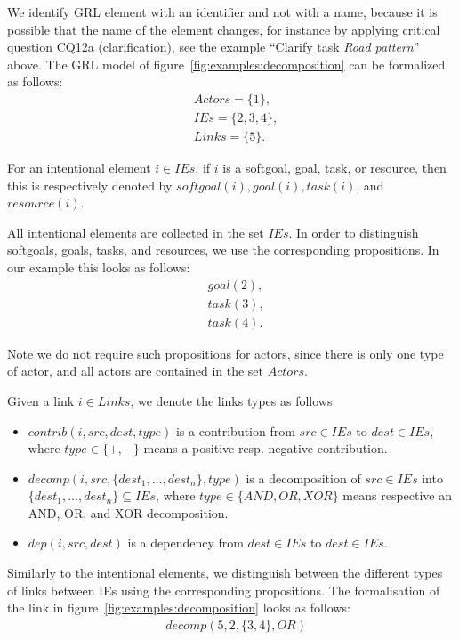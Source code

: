 \rationale{} We identify GRL element with an identifier and not with a name, because it is possible that the name of the element changes, for instance by applying critical question CQ12a (clarification), see the example ``Clarify task \emph{Road pattern}'' above. The GRL model of figure~\ref{fig:examples:decomposition} can be formalized as follows: 
\begin{align*}
&Actors = \{1\},\\
&IEs = \{2, 3, 4\},\\ 
&Links = \{5\}.
\end{align*}

\begin{definition}
For an intentional element $i\in IEs$, if $i$ is a softgoal, goal, task, or resource, then this is respectively denoted by $softgoal(i), goal(i), task(i)$, and $resource(i)$.
\end{definition}

\rationale{} All intentional elements are collected in the set $IEs$. In order to distinguish softgoals, goals, tasks, and resources, we use the corresponding propositions. In our example this looks as follows:
\begin{align*}
&goal(2),\\
&task(3),\\
&task(4).
\end{align*}

Note we do not require such propositions for actors, since there is only one type of actor, and all actors are contained in the set $Actors$.

\begin{definition}[Links]
Given a link $i\in Links$, we denote the links types as follows:
\begin{itemize}
\item $contrib(i,src,dest,type)$ is a contribution from $src\in IEs$ to $dest\in IEs$, where $type\in\{+,-\}$ means a positive resp. negative contribution. 
\item $decomp(i,src,\{dest_1,\ldots,dest_n\},type)$ is a decomposition of $src\in IEs$ into $\{dest_1,\dots,dest_n\}\subseteq IEs$, where $type\in\{AND,OR,XOR\}$ means respective an AND, OR, and XOR decomposition. 
\item $dep(i,src,dest)$ is a dependency from $dest\in IEs$ to $dest\in IEs$.
\end{itemize}
\end{definition}

\rationale{} Similarly to the intentional elements, we distinguish between the different types of links between IEs using the corresponding propositions. The formalisation of the link in figure~\ref{fig:examples:decomposition} looks as follows:
\begin{align*}
&decomp(5, 2, \{3,4\}, OR)
\end{align*}

